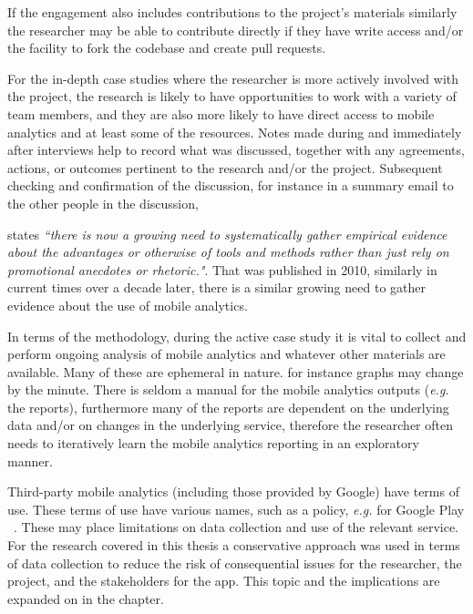 If the engagement also includes contributions to the project's materials similarly the researcher may be able to contribute directly if they have write access and/or the facility to fork the codebase and create pull requests.

For the in-depth case studies where the researcher is more actively involved with the project, the research is likely to have opportunities to work with a variety of team members, and they are also more likely to have direct access to mobile analytics and at least some of the resources. Notes made during and immediately after interviews help to record what was discussed, together with any agreements, actions, or outcomes pertinent to the research and/or the project. Subsequent checking and confirmation of the discussion, for instance in a summary email to the other people in the discussion, 

\citet[p.250]{falessi2010_applying_ESE_to_sw_architecture_etc} states \emph{``there is now a growing need to systematically gather empirical evidence about the advantages or otherwise of tools and methods rather than just rely on promotional anecdotes or rhetoric."}. That was published in 2010, similarly in current times over a decade later, there is a similar growing need to gather evidence about the use of mobile analytics.

In terms of the methodology, during the active case study it is vital to collect and perform ongoing analysis of mobile analytics and whatever other materials are available. Many of these are ephemeral in nature. for instance graphs may change by the minute. There is seldom a manual for the mobile analytics outputs (\textit{e.g.} the reports), furthermore many of the reports are dependent on the underlying data and/or on changes in the underlying service, therefore the researcher often needs to iteratively learn the mobile analytics reporting in an exploratory manner. 

Third-party mobile analytics (including those provided by Google) have terms of use. These terms of use have various names, such as a policy, \textit{e.g.} for Google Play ~\citet{google_play_developer_policy_center}. These may place limitations on data collection and use of the relevant service. For the research covered in this thesis a conservative approach was used in terms of data collection to reduce the risk of consequential issues for the researcher, the project, and the stakeholders for the app. This topic and the implications are expanded on in the  chapter.

